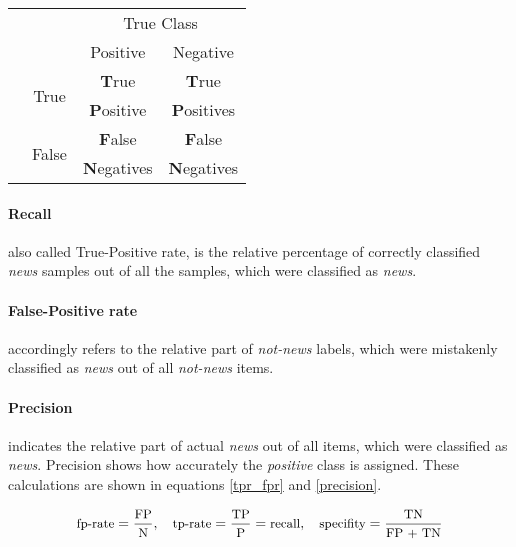 		\begin{table}[H]
			\centering
			\begin{tabular}{|cc|cc|}
				\cline{3-4}
				\multicolumn{2}{c|}{}&\multicolumn{2}{c|}{True Class}\\
				\multicolumn{2}{c|}{}& Positive & Negative\\
				\cline{1-4}
				\vspace*{-2mm}
				&\multirow{2}{*}{True} & \multicolumn{1}{|c|}{\textbf{T}rue} & \multicolumn{1}{c|}{\textbf{T}rue}\\
				\multirow{3}{*}{\rotatebox[origin=c]{90}{\parbox[c]{1cm}{\centering Predicted Class}}} 
				&& \multicolumn{1}{|c|}{\textbf{P}ositive} & \multicolumn{1}{c|}{\textbf{P}ositives}\\
				\cline{3-4}
				\vspace*{-2mm}
				&\multirow{2}{*}{False} & \multicolumn{1}{|c|}{\textbf{F}alse} & \multicolumn{1}{c|}{\textbf{F}alse}\\
				&& \multicolumn{1}{|c|}{\textbf{N}egatives} & \multicolumn{1}{c|}{\textbf{N}egatives}\\
				\cline{1-4}
			\end{tabular}
		\end{table}
		
		\paragraph{Recall} also called True-Positive rate, is the relative percentage of correctly classified \textit{news} samples out of all the samples, which were classified as \textit{news}. 
		
		\paragraph{False-Positive rate}
		accordingly refers to the relative part of \textit{not-news} labels, which were mistakenly classified as \textit{news} out of all \textit{not-news} items. 
		
		\paragraph{Precision}
		 indicates the relative part of actual \textit{news} out of all items, which were classified as \textit{news}. Precision shows how accurately the \textit{positive} class is assigned. These calculations are shown in equations \ref{tpr_fpr} and \ref{precision}.

		\begin{equation}
			\small
				\text{fp-rate} = \frac{\text{FP}}{\text{N}}, \ \ \  
				\text{tp-rate} = \frac{\text{TP}}{\text{P}} = \text{recall}, \ \ \  
				\text{specifity} = \frac{\text{TN}}{\text{FP + TN}}
			\label{tpr_fpr}
		\end{equation}
		
